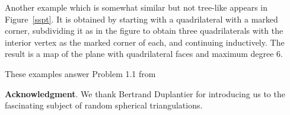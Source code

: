 \documentclass[12pt,naturalnames]{article}
\numberwithin{equation}{section}
\numberwithin{figure}{section}
\numberwithin{theorem}{section}
\def\BabaiGr{MR1447704}
\begin{document}
\medskip

Another example which is somewhat similar but not tree-like appears in
Figure~\ref{sspt}.  It is obtained by starting
with a quadrilateral with a marked corner,
subdividing it as in the figure to obtain
three quadrilaterals with the interior
vertex as the marked corner of each, and continuing inductively.
The result is a map of the plane with quadrilateral faces and
maximum degree $6$.

These examples answer Problem 1.1 from \cite{\BabaiGr}

{\bigskip\noindent\bf Acknowledgment}.
We thank Bertrand Duplantier for introducing us to the
fascinating subject of random spherical triangulations.







\end{document}
